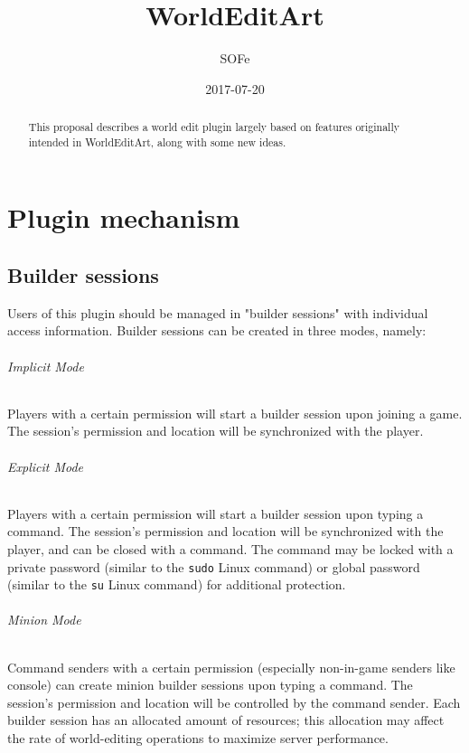 \documentclass{report}
\title{WorldEditArt}
\date{2017-07-20}
\author{SOFe}
\begin{document}

	\maketitle
	\tableofcontents

	\begin{abstract}
		This proposal describes a world edit plugin largely based on features originally intended in WorldEditArt,
		along with some new ideas.
	\end{abstract}

	\part{Plugin mechanism}
		\chapter{Builder sessions}
			Users of this plugin should be managed in "builder sessions" with individual access information. Builder
			sessions can be created in three modes, namely:
			\paragraph{Implicit Mode}
				Players with a certain permission will start a builder session upon joining a game. The session's permission
				and location will be synchronized with the player.
			\paragraph{Explicit Mode}
				Players with a certain permission will start a builder session upon typing a command. The session's
				permission and location will be synchronized with the player, and can be closed with a command. The command
				may be locked with a private password (similar to the \texttt{sudo} Linux command) or global password
				(similar to the \texttt{su} Linux command) for additional protection.
			\paragraph{Minion Mode}
				Command senders with a certain permission (especially non-in-game senders like console) can create minion
				builder sessions upon typing a command. The session's permission and location will be controlled by the
				command sender.
			Each builder session has an allocated amount of resources; this allocation may affect the rate of world-editing
			operations to maximize server performance.
\end{document}
